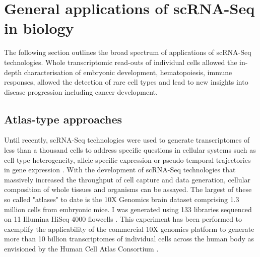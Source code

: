 
\section{General applications of scRNA-Seq in biology}

The following section outlines the broad spectrum of applications of scRNA-Seq technologies. Whole transcriptomic read-outs of individual cells allowed the in-depth characterisation of embryonic development, hematopoiesis, immune responses, allowed the detection of rare cell types and lead to new insights into disease progression including cancer development. 

\subsection{Atlas-type approaches}

Until recently, scRNA-Seq technologies were used to generate transcriptomes of less than a thousand cells to address specific questions in cellular systems such as cell-type heterogeneity, allele-specific expression or pseudo-temporal trajectories in gene expression \citep{Kolodziejczyk2015review}. With the development of scRNA-Seq technologies that massively increased the throughput of cell capture and data generation, cellular composition of whole tissues and organisms can be assayed. The largest of these so called "atlases" to date is the 10X Genomics\textsuperscript{\textregistered}{} brain dataset comprising 1.3 million cells from embryonic mice. I was generated using 133 libraries sequenced on 11 Illumina HiSeq\textsuperscript{\textregistered}{} 4000 flowcells \citep{Note2017}. This experiment has been performed to exemplify the applicability of the commercial 10X genomics platform to generate more than 10 billion transcriptomes of individual cells across the human body as envisioned by the Human Cell Atlas Consortium \citep{Regev2017}.\\

